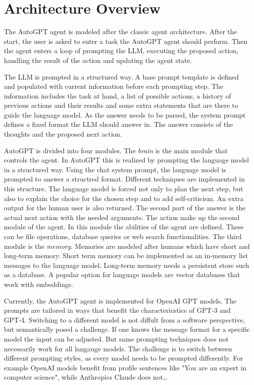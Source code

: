 \documentclass[english, version-2022-01]{uzl-thesis}
\begin{document}
\section{Architecture Overview}

The AutoGPT agent is modeled after the classic agent architecture.
After the start, the user is asked to enter a task the AutoGPT agent should perform.
Then the agent enters a loop of prompting the LLM, executing the proposed action, handling the result of the action and updating the agent state.

The LLM is prompted in a structured way.
A base prompt template is defined and populated with current information before each prompting step.
The information includes the task at hand, a list of possible actions, a history of previous actions and their results and some extra statements that are there to guide the language model.
As the answer needs to be parsed, the system prompt defines a fixed format the LLM should answer in.
The answer consists of the thoughts and the proposed next action.


AutoGPT is divided into four modules. The \textit{brain} is the main module that controls the agent.
In AutoGPT this is realized by prompting the language model in a structured way.
Using the chat system prompt, the language model is prompted to answer a structred format.
Different techniques are implemented in this structure.
The language model is forced not only to plan the next step, but also to explain the choice for the chosen step and to add self-criticism.
An extra output for the human user is also returned.
The second part of the answer is the actual next action with the needed arguments.
The action make up the second module of the agent. In this module the abilities of the agent are defined.
These can be file operations, database queries or web search functionalities. The third module is the \textit{memory}.
Memories are modeled after humans which have short and long-term memory.
Short term memory can be implemented as an in-memory list messages to the language model.
Long-term memory needs a persistent store such as a database.
A popular option for language models are vector databases that work with embeddings.


Currently, the AutoGPT agent is implemented for OpenAI GPT models.
The prompts are tailored in ways that benefit the charactericstics of GPT-3 and GPT-4.
Switching to a different model is not diffult from a software perspective, but semantically posed a challenge.
If one knows the message format for a specific model the input can be adjusted.
But same prompting techniques does not necessarily work for all langauge models.
The challenge is to switch between different prompting styles, as every model needs to be prompted differently.
For example OpenAI models benefit from profile sentences like "You are an expert in computer science", while Anthropics Claude does not\dots
\end{document}
